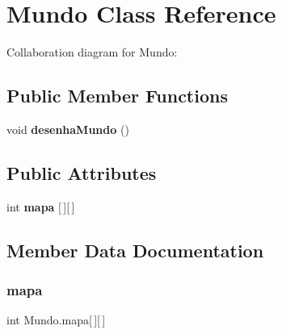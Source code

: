 \hypertarget{classMundo}{}\section{Mundo Class Reference}
\label{classMundo}


Collaboration diagram for Mundo\+:
\subsection*{Public Member Functions}
\begin{DoxyCompactItemize}
\item 
\mbox{\label{classMundo_adbafcb32f5f209eda97e1c7953c6e599}} 
void {\bfseries desenha\+Mundo} ()
\end{DoxyCompactItemize}
\subsection*{Public Attributes}
\begin{DoxyCompactItemize}
\item 
int {\bfseries mapa} \mbox{[}$\,$\mbox{]}\mbox{[}$\,$\mbox{]}
\end{DoxyCompactItemize}


\subsection{Member Data Documentation}
\mbox{\label{classMundo_a8332b2d52b9f317338a4d6cbe10bbcbb}} 
\subsubsection{\texorpdfstring{mapa}{mapa}}
{\footnotesize\ttfamily int Mundo.\+mapa\mbox{[}$\,$\mbox{]}\mbox{[}$\,$\mbox{]}}

